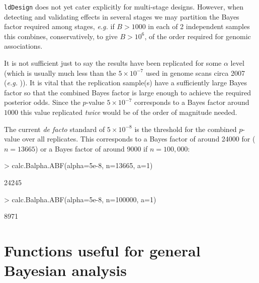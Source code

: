 \documentclass[a4paper,10pt]{amsart}
\def\ldDesign{\texttt{ldDesign}}
\def\eg{\textit{e.g.}}
\begin{document}
\ldDesign{} does not yet cater explicitly for multi-stage
designs. However, when detecting and validating effects in several
stages we may partition the Bayes factor required among stages,
\eg{} if $B > 1000$ in each of 2 independent samples this combines,
conservatively, to give $B > 10^6$, of the order required for genomic
associations.


It is not sufficient just to say the results have been replicated for
some $\alpha$ level (which is usually much less than the $5\times 10^{-7}$ used
in genome scans circa 2007 (\eg{} )).  It is vital that
the replication sample(s) have a sufficiently large Bayes factor so that
the combined Bayes factor is large enough to achieve the required
posterior odds. Since the $p$-value $5\times 10^{-7}$ corresponds to
a Bayes factor around $1000$ this value replicated \textit{twice} would be of the
order of magnitude needed. 

The current \textit{de facto} standard of $5\times 10^{-8}$ is
the threshold for the combined $p$-value over all replicates. This
 corresponds to a Bayes factor of around 24000 for \cite{Weedonetal2008}($n=13665$) or
a Bayes factor of around 9000 if $n=100,000$:
\begin{Schunk}
\begin{Sinput}
> calc.Balpha.ABF(alpha=5e-8, n=13665, a=1)
\end{Sinput}
\begin{Soutput}
[1] 24245
\end{Soutput}
\begin{Sinput}
> calc.Balpha.ABF(alpha=5e-8, n=100000, a=1)
\end{Sinput}
\begin{Soutput}
[1] 8971
\end{Soutput}
\end{Schunk}



\section{Functions useful for general Bayesian analysis}
\label{sec:bayesianfunctions}  
\end{document}
